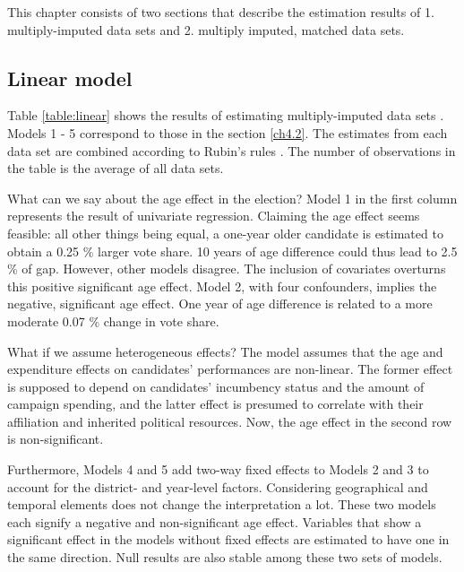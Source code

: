 \documentclass[a4paper, 12pt]{article}\usepackage[dvipdfmx]{graphicx}\usepackage[]{xcolor}
\begin{document}
This chapter consists of two sections that describe the estimation results of 1. multiply-imputed data sets and 2. multiply imputed, matched data sets. 

\subsection{Linear model} \label{ch5.1}

Table \ref{table:linear} shows the results of estimating multiply-imputed data sets \footnotemark{}. Models 1 - 5 correspond to those in the section \ref{ch4.2}. The estimates from each data set are combined according to Rubin's rules \citep{schafer1998multiple}. The number of observations in the table is the average of all data sets. 




What can we say about the age effect in the election? Model 1 in the first column represents the result of univariate regression. Claiming the age effect seems feasible: all other things being equal, a one-year older candidate is estimated to obtain a 0.25 \% larger vote share. 10 years of age difference could thus lead to 2.5 \% of gap. However, other models disagree. The inclusion of covariates overturns this positive significant age effect. Model 2, with four confounders, implies the negative, significant age effect. One year of age difference is related to a more moderate 0.07 \% change in vote share. 

What if we assume heterogeneous effects? The model assumes that the age and expenditure effects on candidates' performances are non-linear. The former effect is supposed to depend on candidates' incumbency status and the amount of campaign spending, and the latter effect is presumed to correlate with their affiliation and inherited political resources. Now, the age effect in the second row is non-significant. 

Furthermore, Models 4 and 5 add two-way fixed effects to Models 2 and 3 to account for the district- and year-level factors. Considering geographical and temporal elements does not change the interpretation a lot. These two models each signify a negative and non-significant age effect. Variables that show a significant effect in the models without fixed effects are estimated to have one in the same direction. Null results are also stable among these two sets of models. 
\end{document}
